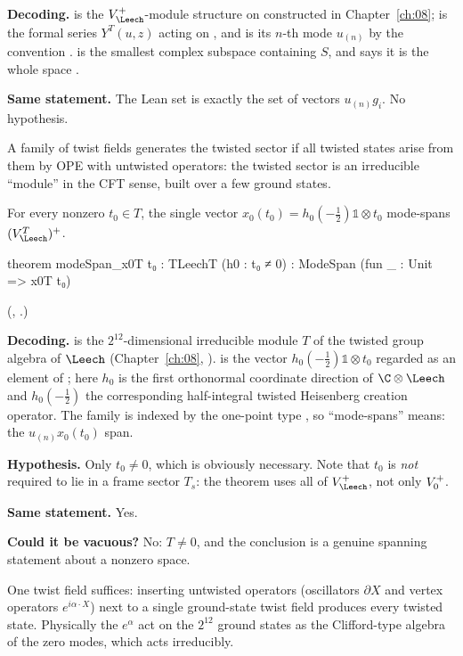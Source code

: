 \begin{dictionary}
\textbf{Decoding.}  is the $V_\Leech^+$-module structure on  constructed in
Chapter~\ref{ch:08};  is the formal series $Y^T(u,z)$ acting on , and
 is its $n$-th mode $u_{(n)}$ by the convention
.   is the smallest complex subspace containing
$S$, and  says it is the whole space .

\textbf{Same statement.}  The Lean set is exactly the set of vectors $u_{(n)}g_i$.  No hypothesis.
\end{dictionary}
\begin{physics}
A family of twist fields generates the twisted sector if all twisted states arise from them by OPE with untwisted operators: the twisted sector is an irreducible ``module'' in the CFT sense, built over a few ground states.
\end{physics}


\begin{theorem}\label{ch14:thm:modespan}
For every nonzero $t_0\in T$, the single vector $x_0(t_0)=h_0(-\tfrac12)\mathbb 1\otimes t_0$
mode-spans $(V_\Leech^T)^+$.
\end{theorem}

\begin{leancode}
theorem modeSpan_x0T {t₀ : TLeechT} (h0 : t₀ ≠ 0) : ModeSpan (fun _ : Unit => x0T t₀)
\end{leancode}
(, .)

\begin{dictionary}
\textbf{Decoding.}   is the $2^{12}$-dimensional irreducible module $T$ of the
twisted group algebra of $\Leech$ (Chapter~\ref{ch:08}, ).
 is the vector $h_0(-\tfrac12)\mathbb 1\otimes t_0$ regarded as an element of
; here $h_0$ is the first orthonormal coordinate direction of $\C\otimes\Leech$ and
$h_0(-\tfrac12)$ the corresponding half-integral twisted Heisenberg creation operator.  The family
is indexed by the one-point type , so ``mode-spans'' means: the $u_{(n)}x_0(t_0)$ span.

\textbf{Hypothesis.}  Only $t_0\ne0$, which is obviously necessary.  Note that $t_0$ is \emph{not}
required to lie in a frame sector $T_s$: the theorem uses all of $V_\Leech^+$, not only $V_0^{+}$.

\textbf{Same statement.}  Yes.

\textbf{Could it be vacuous?}  No: $T\ne0$, and the conclusion is a genuine spanning statement
about a nonzero space.
\end{dictionary}
\begin{physics}
One twist field suffices: inserting untwisted operators (oscillators $\partial X$ and vertex operators $e^{i\alpha\cdot X}$) next to a single ground-state twist field produces every twisted state. Physically the $e^\alpha$ act on the $2^{12}$ ground states as the Clifford-type algebra of the zero modes, which acts irreducibly.
\end{physics}


